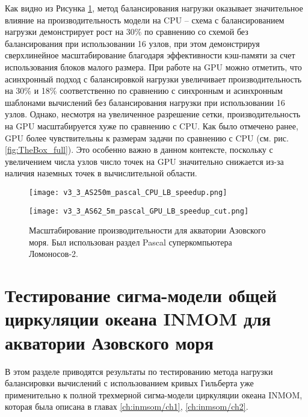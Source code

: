 Как видно из Рисунка \ref{fig:AzovSea}, метод балансирования нагрузки оказывает значительное влияние на производительность модели на CPU – схема с балансированием нагрузки демонстрирует рост на 30\% по сравнению со схемой без балансирования при использовании 16 узлов, при этом демонстрируя сверхлинейное масштабирование благодаря эффективности кэш-памяти за счет использования блоков малого размера.
При работе на GPU можно отметить, что асинхронный подход с балансировкой нагрузки увеличивает производительность на 30\% и 18\% соответственно по сравнению с синхронным и асинхронным шаблонами вычислений без балансирования нагрузки при использовании 16 узлов.
Однако, несмотря на увеличенное разрешение сетки, производительность на GPU масштабируется хуже по сравнению с CPU. Как было отмечено ранее, GPU более чувствительны к размерам задачи по сравнению с CPU (см. рис. \ref{fig:TheBox_full}).
Это особенно важно в данном контексте, поскольку с увеличением числа узлов число точек на GPU значительно снижается из-за наличия наземных точек в вычислительной области.

\begin{figure}[!ht]
	\begin{minipage}{0.5\linewidth}
	\centering
	\texttt{[image: v3\_3\_AS250m\_pascal\_CPU\_LB\_speedup.png]}
	\end{minipage}
	\begin{minipage}{0.5\linewidth}
	\centering
    \texttt{[image: v3\_3\_AS62\_5m\_pascal\_GPU\_LB\_speedup\_cut.png]}
	\end{minipage}
	\vspace{3pt}
	\caption{Масштабирование производительности для акватории Азовского моря. Был использован раздел Pascal суперкомпьютера Ломоносов-2.}
	\label{fig:AzovSea}
\end{figure}

\section{Тестирование сигма-модели общей циркуляции океана INMOM для акватории Азовского моря}\label{sec:inmsom/ch3/sec1}

В этом разделе приводятся результаты по тестированию метода нагрузки балансировки вычислений  с использованием кривых Гильберта уже применительно к полной трехмерной сигма-модели циркуляции океана INMOM, которая была описана в главах \ref{ch:inmsom/ch1}, \ref{ch:inmsom/ch2}.
	
